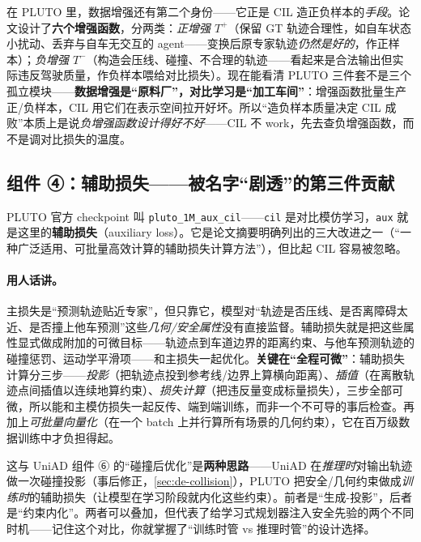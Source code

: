\begin{insight}
在 PLUTO 里，数据增强还有第二个身份——它正是 CIL 造正负样本的\emph{手段}。论文设计了\textbf{六个增强函数}，分两类：\emph{正增强 $T^+$}（保留 GT 轨迹合理性，如自车状态小扰动、丢弃与自车无交互的 agent——变换后原专家轨迹\emph{仍然是好的}，作正样本）；\emph{负增强 $T^-$}（构造会压线、碰撞、不合理的轨迹——看起来是合法输出但实际违反驾驶质量，作负样本喂给对比损失）。现在能看清 PLUTO 三件套不是三个孤立模块——\textbf{数据增强是“原料厂”，对比学习是“加工车间”}：增强函数批量生产正/负样本，CIL 用它们在表示空间拉开好坏。所以“造负样本质量决定 CIL 成败”本质上是说\emph{负增强函数设计得好不好}——CIL 不 work，先去查负增强函数，而不是调对比损失的温度。
\end{insight}

\subsection{组件 ④：辅助损失——被名字“剧透”的第三件贡献}
\label{sec:de-aux}

PLUTO 官方 checkpoint 叫 \texttt{pluto\_1M\_aux\_cil}——\texttt{cil} 是对比模仿学习，\texttt{aux} 就是这里的\textbf{辅助损失}（auxiliary loss）。它是论文摘要明确列出的三大改进之一（“一种广泛适用、可批量高效计算的辅助损失计算方法”），但比起 CIL 容易被忽略。

\paragraph{用人话讲。}
主损失是“预测轨迹贴近专家”，但只靠它，模型对“轨迹是否压线、是否离障碍太近、是否撞上他车预测”这些\emph{几何/安全属性}没有直接监督。辅助损失就是把这些属性显式做成附加的可微目标——轨迹点到车道边界的距离约束、与他车预测轨迹的碰撞惩罚、运动学平滑项——和主损失一起优化。\textbf{关键在“全程可微”}：辅助损失计算分三步——\emph{投影}（把轨迹点投到参考线/边界上算横向距离）、\emph{插值}（在离散轨迹点间插值以连续地算约束）、\emph{损失计算}（把违反量变成标量损失），三步全部可微，所以能和主模仿损失一起反传、端到端训练，而非一个不可导的事后检查。再加上\emph{可批量向量化}（在一个 batch 上并行算所有场景的几何约束），它在百万级数据训练中才负担得起。

\begin{insight}
这与 UniAD 组件 ⑥ 的“碰撞后优化”是\textbf{两种思路}——UniAD 在\emph{推理时}对输出轨迹做一次碰撞投影（事后修正，\cref{sec:de-collision}），PLUTO 把安全/几何约束做成\emph{训练时}的辅助损失（让模型在学习阶段就内化这些约束）。前者是“生成-投影”，后者是“约束内化”。两者可以叠加，但代表了给学习式规划器注入安全先验的两个不同时机——记住这个对比，你就掌握了“训练时管 vs 推理时管”的设计选择。
\end{insight}

